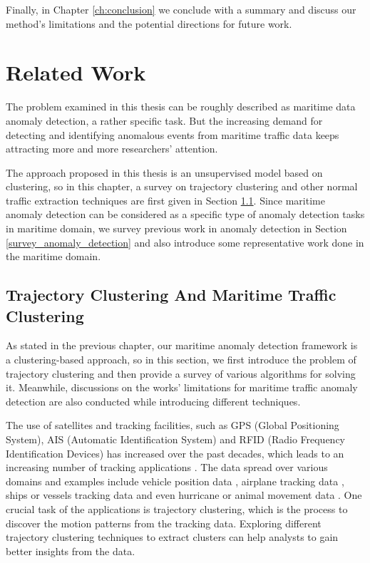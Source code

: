 \documentclass[12pt,glossary]{dalcsthesis}
\begin{document}
Finally, in Chapter \ref{ch:conclusion} we conclude with a summary and discuss our method's limitations and the potential directions for future work.

\chapter{Related Work}
\label{ch:background}
The problem examined in this thesis can be roughly described as maritime data anomaly detection, a rather specific task. But the increasing demand for detecting and identifying anomalous events from maritime traffic data keeps attracting more and more researchers' attention. 

The approach proposed in this thesis is an unsupervised model based on clustering, so in this chapter, a survey on trajectory clustering and other normal traffic extraction techniques are first given in Section \ref{survey_normal_traffic_extraction}. Since maritime anomaly detection can be considered as a specific type of anomaly detection tasks in maritime domain,  we  survey previous work in anomaly detection in Section \ref{survey_anomaly_detection} and also introduce some representative work done in the maritime domain.


\section{Trajectory Clustering And Maritime Traffic Clustering}
\label{survey_normal_traffic_extraction}

As stated in the previous chapter, our maritime anomaly detection framework is a clustering-based approach, so in this section, we first introduce the problem of trajectory clustering and then provide a survey of various algorithms for solving it. Meanwhile, discussions on the works' limitations for maritime traffic anomaly detection are also conducted while introducing different techniques.

The use of satellites and tracking facilities, such as GPS (Global Positioning System), AIS (Automatic Identification System) and RFID (Radio Frequency Identification Devices) has increased over the past decades, which leads to an increasing number of tracking applications \cite{airspaceMonitoring}. The data spread over various domains and examples include vehicle position data \cite{vehicle_clustering}, airplane tracking data \cite{airspaceMonitoring}, ships or vessels tracking data \cite{CBSMoT}\cite{PallottaFramework}\cite{vespe12}\cite{pallotta13}\cite{DDBscan} and even hurricane or animal movement data \cite{Lee07}\cite{vfkm}.  One crucial task of the applications is trajectory clustering, which is the process to discover the motion patterns from the tracking data.  Exploring different trajectory clustering techniques to extract clusters can help analysts to gain better insights from the data. 
\end{document}
